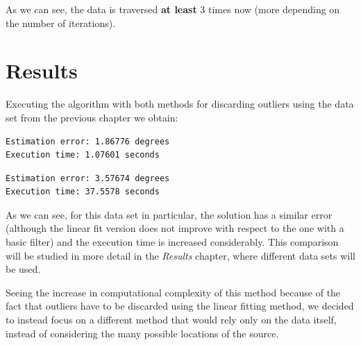 As we can see, the data is traversed \textbf{at least} 3 times now (more depending on the number of iterations).

\section{Results}

Executing the algorithm with both methods for discarding outliers using the data set from the previous chapter we obtain:

\begin{minipage}{\linewidth}
\begin{lstlisting}[caption=Decreasing range using a cutoff value for outliers]
Estimation error: 1.86776 degrees
Execution time: 1.07601 seconds
\end{lstlisting}
\end{minipage}

\begin{minipage}{\linewidth}
\begin{lstlisting}[caption=Decreasing range using linear fit for outliers]
Estimation error: 3.57674 degrees
Execution time: 37.5578 seconds 
\end{lstlisting}
\end{minipage}

As we can see, for this data set in particular, the solution has a similar error (although the linear fit version does not improve with respect to the one with a basic filter) and the execution time is increased considerably. This comparison will be studied in more detail in the \textit{Results} chapter, where different data sets will be used.

Seeing the increase in computational complexity of this method because of the fact that outliers have to be discarded using the linear fitting method, we decided to instead focus on a different method that would rely only on the data itself, instead of considering the many possible locations of the source.
